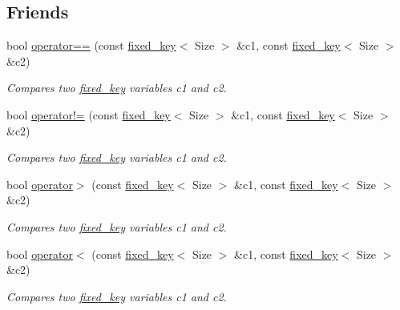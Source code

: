 \subsection*{Friends}
\begin{DoxyCompactItemize}
\item 
bool \mbox{\hyperlink{classaacio_1_1fixed__key_a30f70a7e52cc0469c1e48d261fec6f48}{operator==}} (const \mbox{\hyperlink{classaacio_1_1fixed__key}{fixed\+\_\+key}}$<$ Size $>$ \&c1, const \mbox{\hyperlink{classaacio_1_1fixed__key}{fixed\+\_\+key}}$<$ Size $>$ \&c2)
\begin{DoxyCompactList}\small\item\em Compares two \mbox{\hyperlink{classaacio_1_1fixed__key}{fixed\+\_\+key}} variables c1 and c2. \end{DoxyCompactList}\item 
bool \mbox{\hyperlink{classaacio_1_1fixed__key_ac19901f66d7942ad087edef0daef485d}{operator!=}} (const \mbox{\hyperlink{classaacio_1_1fixed__key}{fixed\+\_\+key}}$<$ Size $>$ \&c1, const \mbox{\hyperlink{classaacio_1_1fixed__key}{fixed\+\_\+key}}$<$ Size $>$ \&c2)
\begin{DoxyCompactList}\small\item\em Compares two \mbox{\hyperlink{classaacio_1_1fixed__key}{fixed\+\_\+key}} variables c1 and c2. \end{DoxyCompactList}\item 
bool \mbox{\hyperlink{classaacio_1_1fixed__key_a0d80d7fcf875276760867c2be8b66438}{operator$>$}} (const \mbox{\hyperlink{classaacio_1_1fixed__key}{fixed\+\_\+key}}$<$ Size $>$ \&c1, const \mbox{\hyperlink{classaacio_1_1fixed__key}{fixed\+\_\+key}}$<$ Size $>$ \&c2)
\begin{DoxyCompactList}\small\item\em Compares two \mbox{\hyperlink{classaacio_1_1fixed__key}{fixed\+\_\+key}} variables c1 and c2. \end{DoxyCompactList}\item 
bool \mbox{\hyperlink{classaacio_1_1fixed__key_aed9cc9961cc5c84cdefa193a7baf3f9a}{operator$<$}} (const \mbox{\hyperlink{classaacio_1_1fixed__key}{fixed\+\_\+key}}$<$ Size $>$ \&c1, const \mbox{\hyperlink{classaacio_1_1fixed__key}{fixed\+\_\+key}}$<$ Size $>$ \&c2)
\begin{DoxyCompactList}\small\item\em Compares two \mbox{\hyperlink{classaacio_1_1fixed__key}{fixed\+\_\+key}} variables c1 and c2. \end{DoxyCompactList}\item 

\end{DoxyCompactItemize}
